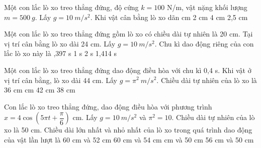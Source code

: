 \begin{vidu}%
Một con lắc lò xo treo thẳng đứng, độ cứng $k=100$ N/m, vật nặng khối lượng $m=500\ g$.  Lấy $g = 10\ m/s^2$. Khi vật cân bằng lò xo dãn
\choice
{ cm}
{2 cm}
{4 cm}
{2,5 cm}
\end{vidu} %
\begin{vidu}%
Một con lắc lò xo treo thẳng đứng gồm lò xo có chiều dài tự nhiên là 20 cm. Tại vị trí cân bằng lò xo dài 24 cm. Lấy $g = 10\ m/s^2$. Chu kì dao động riêng của con lắc lò xo này là
\choice
{,397 s}
{1 s}
{2 s}
{1,414 s}
\end{vidu} %

\begin{vidu}%
Một con lắc lò xo treo thẳng đứng dao động điều hòa với chu kì 0,4 s. Khi vật ở vị trí cân bằng, lò xo dài 44 cm. Lấy $g = \pi^2 \ m/s^2$. Chiều dài tự nhiên của lò xo là
\choice
{36 cm}
{ cm}
{42 cm}
{38 cm}
\end{vidu} %
\begin{vidu}%
Con lắc lò xo treo thẳng đứng, dao động điều hòa với phương trình $x=4\cos  \left( 5\pi t+\dfrac{\pi}{6} \right)$ cm. Lấy $g = 10\ m/s^2$ và $\pi^2 = 10$. Chiều dài tự nhiên của lò xo là 50 cm. Chiều dài lớn nhất và nhỏ nhất của lò xo trong quá trình dao động của vật lần lượt là
\choice
{60 cm và 52 cm}
{60 cm và 54 cm}
{ cm và 50 cm}
{56 cm và 50 cm}
\end{vidu} %

